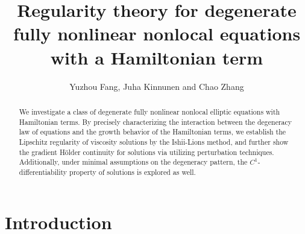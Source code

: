 \documentclass[11pt,reqno]{amsart}
\numberwithin{equation}{section}
\begin{document}
\title[\hfil Regularity for degenerate fully nonlinear nonlocal equations] {Regularity theory for degenerate fully nonlinear nonlocal equations with a Hamiltonian term}
\author[Y. Fang, J. Kinnunen, C. Zhang]{Yuzhou Fang, Juha Kinnunen and Chao Zhang}


\address{Yuzhou Fang\hfill\break School of Mathematics, Harbin Institute of Technology, Harbin 150001, China}

\address{Juha Kinnunen \hfill\break Department of Mathematics, P.O. Box 11100, Aalto University, Finland}

\address{Chao Zhang\hfill\break School of Mathematics and Institute for Advanced Study in Mathematics, Harbin Institute of Technology, Harbin 150001, China}


   


\begin{abstract}
We investigate a class of degenerate fully nonlinear nonlocal elliptic equations with Hamiltonian terms. By precisely characterizing the interaction between the degeneracy law of equations and the growth behavior of the Hamiltonian terms, we establish the Lipschitz regularity of viscosity solutions by the Ishii-Lions method, and further show the gradient H\"{o}lder continuity for solutions via utilizing perturbation techniques. Additionally, under minimal assumptions on the degeneracy pattern, the $C^1$-differentiability property of solutions is explored as well. %
\end{abstract}


\maketitle

\section{Introduction}
\label{sec0}
\end{document}
